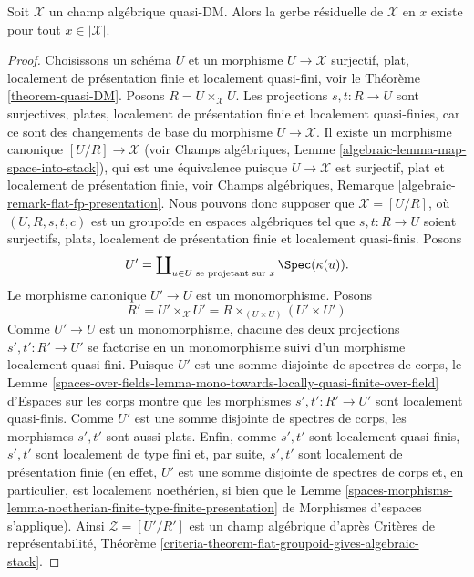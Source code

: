 \begin{lemma}
\label{lemma-every-point-residual-gerbe-quasi-DM}
Soit $\mathcal{X}$ un champ algébrique quasi-DM.
Alors la gerbe résiduelle de $\mathcal{X}$ en $x$ existe pour tout
$x \in |\mathcal{X}|$.
\end{lemma}

\begin{proof}
Choisissons un schéma $U$ et un morphisme $U \to \mathcal{X}$ surjectif,
plat, localement de présentation finie et localement quasi-fini, voir le
Théorème \ref{theorem-quasi-DM}.
Posons $R = U \times_\mathcal{X} U$. Les projections $s, t : R \to U$
sont surjectives, plates, localement de présentation finie et localement
quasi-finies, car ce sont des changements de base du morphisme
$U \to \mathcal{X}$. Il existe un morphisme canonique
$[U/R] \to \mathcal{X}$ (voir Champs algébriques, Lemme
\ref{algebraic-lemma-map-space-into-stack}), qui est une équivalence puisque
$U \to \mathcal{X}$ est surjectif, plat et localement de présentation finie,
voir Champs algébriques, Remarque
\ref{algebraic-remark-flat-fp-presentation}.
Nous pouvons donc supposer que $\mathcal{X} = [U/R]$, où
$(U, R, s, t, c)$ est un groupoïde en espaces algébriques tel que
$s, t : R \to U$ soient surjectifs, plats, localement de présentation finie
et localement quasi-finis. Posons
$$
U' = \coprod\nolimits_{u \in U\text{ se projetant sur }x} \Spec(\kappa(u)).
$$
Le morphisme canonique $U' \to U$ est un monomorphisme. Posons
$$
R' = U' \times_\mathcal{X} U' =
R \times_{(U \times U)} (U' \times U')
$$
Comme $U' \to U$ est un monomorphisme, chacune des deux projections
$s', t' : R' \to U'$ se factorise en un monomorphisme suivi d'un morphisme
localement quasi-fini. Puisque $U'$ est une somme disjointe de spectres
de corps, le Lemme
\ref{spaces-over-fields-lemma-mono-towards-locally-quasi-finite-over-field}
d'Espaces sur les corps montre que les morphismes
$s', t' : R' \to U'$ sont localement quasi-finis. Comme $U'$ est une
somme disjointe de spectres de corps, les morphismes $s', t'$ sont aussi
plats. Enfin, comme $s', t'$ sont localement quasi-finis, $s', t'$ sont
localement de type fini et, par suite, $s', t'$ sont localement de
présentation finie (en effet,
$U'$ est une somme disjointe de spectres de corps et, en particulier,
est localement noethérien, si bien que le Lemme
\ref{spaces-morphisms-lemma-noetherian-finite-type-finite-presentation}
de Morphismes d'espaces s'applique). Ainsi $\mathcal{Z} = [U'/R']$ est un
champ algébrique d'après Critères de représentabilité, Théorème
\ref{criteria-theorem-flat-groupoid-gives-algebraic-stack}.

\end{proof}
